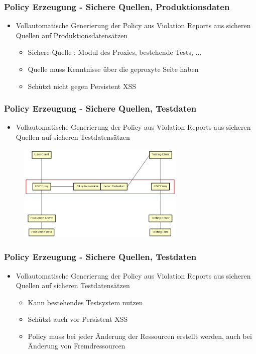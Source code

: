 \documentclass[handout]{beamer}
\begin{document}
\begin{frame}[c]
\frametitle{Policy Erzeugung - Sichere Quellen, Produktionsdaten}
\begin{itemize}
\item Vollautomatische Generierung der Policy aus Violation Reports aus sicheren Quellen auf Produktionsdatensätzen
\begin{itemize}
\item Sichere Quelle : Modul des Proxies, bestehende Tests, ...
\item Quelle muss Kenntnisse über die geproxyte Seite haben
\item Schützt nicht gegen Persistent XSS 
\end{itemize}
\end{itemize}
\end{frame}

\begin{frame}[c]
\frametitle{Policy Erzeugung - Sichere Quellen, Testdaten}
\begin{itemize}
\item Vollautomatische Generierung der Policy aus Violation Reports aus sicheren Quellen auf sicheren Testdatensätzen
\end{itemize}
\begin{figure}[ht]
	\centering
	\includegraphics[width=8cm]{schema_2.png}
\end{figure}
\end{frame}

\begin{frame}[c]
\frametitle{Policy Erzeugung - Sichere Quellen, Testdaten}
\begin{itemize}
\item Vollautomatische Generierung der Policy aus Violation Reports aus sicheren Quellen auf sicheren Testdatensätzen
\begin{itemize}
\item Kann bestehendes Testsystem nutzen
\item Schützt auch vor Persistent XSS
\item Policy muss bei jeder Änderung der Ressourcen erstellt werden, auch bei Änderung von Fremdressourcen
\end{itemize}
\end{itemize}
\end{frame}
\end{document}
